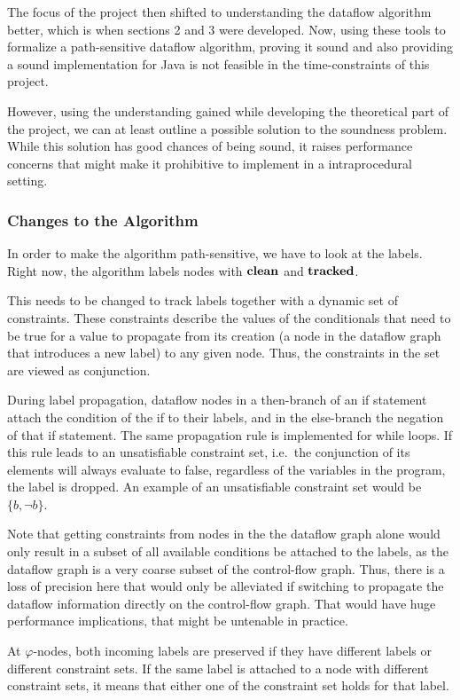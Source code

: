 The focus of the project then shifted to understanding the dataflow algorithm better,
which is when sections 2 and 3 were developed.
Now, using these tools to formalize a path-sensitive dataflow algorithm, proving it sound
and also providing a sound implementation for Java is not feasible in the time-constraints
of this project.

However, using the understanding gained while developing the theoretical part of the project,
we can at least outline a possible solution to the soundness problem.
While this solution has good chances of being sound, it raises performance concerns
that might make it prohibitive to implement in a intraprocedural setting.

\subsubsection*{Changes to the Algorithm} 
In order to make the algorithm path-sensitive, we have to look at the labels.
Right now, the algorithm labels nodes with $\textbf{clean}$ and $\textbf{tracked}$.

This needs to be changed to track labels together with a dynamic set of constraints.
These constraints describe the values of the conditionals that need to be true for a value
to propagate from its creation (a node in the dataflow graph that introduces a new label)
to any given node. Thus, the constraints in the set are viewed as conjunction.

During label propagation, dataflow nodes in a then-branch of an if statement attach the condition of the
if to their labels, and in the else-branch the negation of that if statement.
The same propagation rule is implemented for while loops.
If this rule leads to an unsatisfiable constraint set, i.e.\ the conjunction of its 
elements will always evaluate to false, regardless of the variables in the program,
the label is dropped.
An example of an unsatisfiable constraint set would be $\{b, \neg b\}$.

Note that getting constraints from nodes in the the dataflow graph alone would only result in a subset of all available
conditions be attached to the labels, as the dataflow graph is a very coarse subset of 
the control-flow graph. Thus, there is a loss of precision here that would only be alleviated
if switching to propagate the dataflow information directly on the control-flow graph.
That would have huge performance implications, that might be untenable in practice.

At $\varphi$-nodes, both incoming labels are preserved if they have different labels or different constraint sets.
If the same label is attached to a node with different constraint sets, it means that
either one of the constraint set holds for that label.

